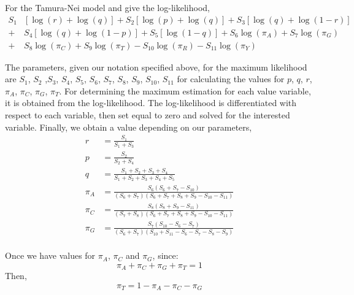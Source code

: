\documentclass[12pt,twoside]{article}
\begin{document}
For the Tamura-Nei model and give the log-likelihood,
\begin{align}
S_{1}&[ \log{(r)}+\log{(q)}] + S_{2}[ \log{(p)}+\log{(q)}] + S_{3}[ \log{(q)}+\log{(1-r)}] \\
 + &S_{4}[ \log{(q)}+\log{(1-p)}] + S_{5}[ \log{(1-q)}]+ S_{6} \log{(\pi_{A})} + S_{7} \log{(\pi_{G})} \\
 + &S_{8} \log{(\pi_{C})} + S_{9} \log{(\pi_{T})} - S_{10} \log{(\pi_{R})} - S_{11} \log{(\pi_{Y})}
\end{align}

The parameters, given our notation specified above, for the maximum likelihood are $S_{1}$, $S_{2}$ ,$S_{3}$, $S_{4}$, $S_{5}$, $S_{6}$, $S_{7}$, $S_{8}$, $S_{9}$, $S_{10}$, $S_{11}$ for calculating the values for $p$, $q$, $r$, $\pi_{A}$, $\pi_{C}$, $\pi_{G}$, $\pi_{T}$. For determining the maximum estimation for each value variable, it is obtained from the log-likelihood. The log-likelihood is differentiated with respect to each variable, then set equal to zero and solved for the interested variable. Finally, we obtain a value depending on our parameters,
\begin{align}
r &= \frac{S_{1}}{S_{1}+S_{3}} \\
p &= \frac{S_{2}}{S_{2}+S_{4}} \\
q &= \frac{S_{1}+S_{2}+S_{3}+S_{4}}{S_{1}+S_{2}+S_{3}+S_{4}+S_{5}} \\
\pi_{A} &= \frac{S_{6}(S_{6}+S_{7}-S_{10})}{(S_{6}+S_{7})(S_{6}+S_{7}+S_{8}+S_{9}-S_{10}-S_{11})} \\
\pi_{C} &= \frac{S_{8}(S_{8}+S_{9}-S_{11})}{(S_{7}+S_{8})(S_{6}+S_{7}+S_{8}+S_{9}-S_{10}-S_{11})} \\
\pi_{G} &= \frac{S_{7}(S_{10}-S_{6}-S_{7})}{(S_{6}+S_{7})(S_{10}+S_{11}-S_{6}-S_{7}-S_{8}-S_{9})} \\
\end{align}

Once we have values for $\pi_{A}$, $\pi_{C}$ and $\pi_{G}$, since:
\begin{equation}
\pi_{A} + \pi_{C} + \pi_{G} + \pi_{T} = 1
\end{equation}
Then,
\begin{equation}
\pi_{T} = 1 - \pi_{A} - \pi_{C} - \pi_{G}
\end{equation}
\end{document}
